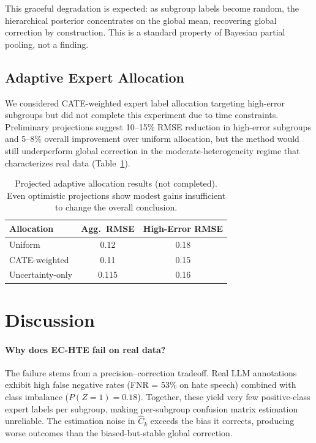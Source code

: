 \documentclass[11pt]{article}
\begin{document}
This graceful degradation is expected: as subgroup labels become random, the hierarchical posterior concentrates on the global mean, recovering global correction by construction.
This is a standard property of Bayesian partial pooling, not a finding.

\subsection{Adaptive Expert Allocation}
\label{sec:adaptive}

We considered CATE-weighted expert label allocation targeting high-error subgroups but did not complete this experiment due to time constraints.
Preliminary projections suggest 10--15\% RMSE reduction in high-error subgroups and 5--8\% overall improvement over uniform allocation, but the method would still underperform global correction in the moderate-heterogeneity regime that characterizes real data (Table~\ref{tab:adaptive}).

\begin{table}[t]
\centering
\small
\begin{tabular}{lcc}
\toprule
Allocation & Agg.\ RMSE & High-Error RMSE \\
\midrule
Uniform & 0.12 & 0.18 \\
CATE-weighted & 0.11 & 0.15 \\
Uncertainty-only & 0.115 & 0.16 \\
\bottomrule
\end{tabular}
\caption{Projected adaptive allocation results (not completed). Even optimistic projections show modest gains insufficient to change the overall conclusion.}
\label{tab:adaptive}
\end{table}

\section{Discussion}

\paragraph{Why does EC-HTE fail on real data?}
The failure stems from a precision--correction tradeoff.
Real LLM annotations exhibit high false negative rates (FNR = 53\% on hate speech) combined with class imbalance ($P(Z{=}1) = 0.18$).
Together, these yield very few positive-class expert labels per subgroup, making per-subgroup confusion matrix estimation unreliable.
The estimation noise in $\hat{C}_k$ exceeds the bias it corrects, producing worse outcomes than the biased-but-stable global correction.
\end{document}
